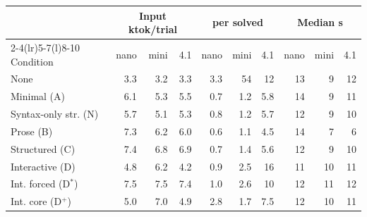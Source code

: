 \begin{tabular}{@{}lrrrrrrrrr@{}}
\toprule
& \multicolumn{3}{c}{Input ktok/trial} & \multicolumn{3}{c}{\textcent{} per solved} & \multicolumn{3}{c}{Median s} \\
\cmidrule(lr){2-4}\cmidrule(lr){5-7}\cmidrule(l){8-10}
Condition & nano & mini & 4.1 & nano & mini & 4.1 & nano & mini & 4.1 \\
\midrule
None & 3.3 & 3.2 & 3.3 & 3.3 & 54 & 12 & 13 & 9 & 12 \\
Minimal (A) & 6.1 & 5.3 & 5.5 & 0.7 & 1.2 & 5.8 & 14 & 9 & 11 \\
Syntax-only str. (N) & 5.7 & 5.1 & 5.3 & 0.8 & 1.2 & 5.7 & 12 & 9 & 10 \\
Prose (B) & 7.3 & 6.2 & 6.0 & 0.6 & 1.1 & 4.5 & 14 & 7 & 6 \\
Structured (C) & 7.4 & 6.8 & 6.9 & 0.7 & 1.4 & 5.6 & 12 & 9 & 10 \\
Interactive (D) & 4.8 & 6.2 & 4.2 & 0.9 & 2.5 & 16 & 11 & 10 & 11 \\
Int. forced (D$^\ast$) & 7.5 & 7.5 & 7.4 & 1.0 & 2.6 & 10 & 12 & 11 & 12 \\
Int. core (D$^+$) & 5.0 & 7.0 & 4.9 & 2.8 & 1.7 & 7.5 & 12 & 10 & 11 \\
\bottomrule
\end{tabular}